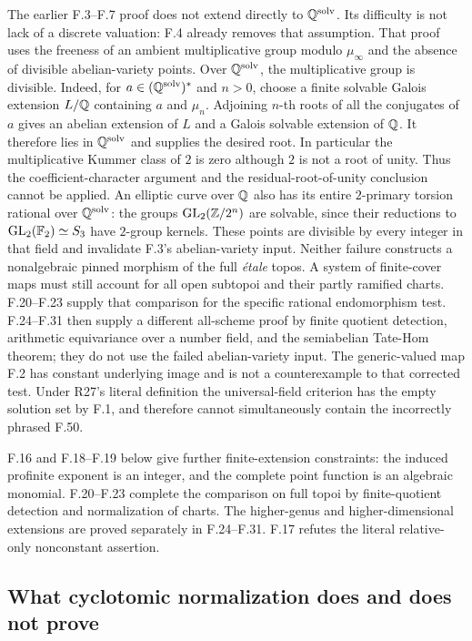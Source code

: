 The earlier F.3--F.7 proof does not extend directly to
$\mathbb Q^{\mathrm{solv}}$. Its difficulty is not lack of a discrete
valuation: F.4 already removes that assumption. That proof uses the
freeness of an ambient multiplicative group modulo $\mu_\infty$
and the absence of divisible abelian-variety points. Over
$\mathbb Q^{\mathrm{solv}}$, the multiplicative group is divisible.
Indeed, for $a\in(\mathbb Q^{\mathrm{solv}})^*$ and $n>0$, choose
a finite solvable Galois extension $L/\mathbb Q$ containing $a$ and
$\mu_n$. Adjoining $n$-th roots of all the conjugates of $a$
gives an abelian extension of $L$ and a Galois solvable extension
of $\mathbb Q$. It therefore lies in $\mathbb Q^{\mathrm{solv}}$ and supplies
the desired root. In particular the multiplicative Kummer class
of $2$ is zero although $2$ is not a root of unity.
Thus the coefficient-character argument and
the residual-root-of-unity conclusion cannot be applied. An elliptic
curve over $\mathbb Q$ also has its entire $2$-primary torsion rational
over $\mathbb Q^{\mathrm{solv}}$: the groups
$\operatorname{GL}_2(\mathbb Z/2^n)$ are solvable, since their reductions
to $\operatorname{GL}_2(\mathbb F_2)\simeq S_3$ have $2$-group kernels.
These points are divisible by every integer in that field and
invalidate F.3's abelian-variety input. Neither failure constructs
a nonalgebraic pinned morphism of the full \emph{\'etale} topos.
A system of finite-cover maps must still account for all open
subtopoi and their partly ramified charts. F.20--F.23 supply that
comparison for the specific rational endomorphism test.
F.24--F.31 then supply a different all-scheme proof by finite
quotient detection, arithmetic equivariance over a number field,
and the semiabelian Tate-Hom theorem; they do not use the failed
abelian-variety input. The generic-valued map
F.2 has constant underlying image and is not a counterexample
to that corrected test. Under R27's literal definition the universal-field
criterion has the empty solution set by F.1, and therefore cannot
simultaneously contain the incorrectly phrased F.50.

F.16 and F.18--F.19 below give further finite-extension constraints:
the induced profinite exponent is an integer, and the complete point
function is an algebraic monomial. F.20--F.23 complete the comparison
on full topoi by finite-quotient detection and normalization of
charts. The higher-genus and higher-dimensional extensions
are proved separately in F.24--F.31. F.17 refutes the literal
relative-only nonconstant assertion.

\subsection{What cyclotomic normalization does and does not prove}

